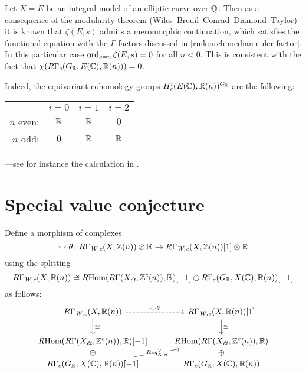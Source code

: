 \documentclass{article}
\numberwithin{equation}{section}
\begin{document}
\begin{example}
  Let $X = E$ be an integral model of an elliptic curve over $\QQ$. Then as a
  consequence of the modularity theorem (Wiles--Breuil--Conrad--Diamond--Taylor)
  it is known that $\zeta (E,s)$ admits a meromorphic continuation, which
  satisfies the functional equation with the $\Gamma$-factors discussed in
  \ref{rmk:archimedian-euler-factor}. In this particular case
  $\ord_{s=n} \zeta (E,s) = 0$ for all $n < 0$. This is consistent with the fact
  that $\chi (R\Gamma_c (G_\RR, E (\CC), \RR (n))) = 0$.

  Indeed, the equivariant cohomology groups $H^i_c (E (\CC), \RR (n))^{G_\RR}$
  are the following:
  \begin{center}
    \renewcommand{\arraystretch}{1.5}
    \begin{tabular}{rccc}
      \hline
      & $i = 0$ & $i = 1$ & $i = 2$ \\
      \hline
      $n$ even: & $\RR$ & $\RR$ & $0$ \\
      $n$ odd: & $0$ & $\RR$ & $\RR$ \\
      \hline
    \end{tabular}
  \end{center}
  ---see for instance the calculation in \cite[Lemma~A.6]{Siebel-2019}.
\end{example}


\section{Special value conjecture}
\label{sec:special-value-conjecture}

\begin{definition}
  Define a morphism of complexes
  \[ \smile\theta\colon R\Gamma_\Wc (X,\ZZ(n)) \otimes \RR \to
    R\Gamma_\Wc (X,\ZZ(n)) [1] \otimes \RR \]
  using the splitting
  \[ R\Gamma_\Wc (X, \RR (n)) \cong
    \RHom (R\Gamma (X_\et, \ZZ^c (n)), \RR) [-1] \oplus
    R\Gamma_c (G_\RR, X (\CC), \RR (n)) [-1] \]
  as follows:
  \[ \begin{tikzcd}
      R\Gamma_\Wc (X, \RR(n)) \ar{d}{\cong}\ar[dashed]{r}{\smile\theta} & R\Gamma_\Wc (X, \RR(n)) [1]\ar{d}{\cong} \\
      \RHom (R\Gamma (X_\et, \ZZ^c (n)), \RR) [-1] & \RHom (R\Gamma (X_\et, \ZZ^c (n)), \RR) \\[-2em]
      \oplus & \oplus \\[-2em]
      R\Gamma_c (G_\RR, X (\CC), \RR (n)) [-1]\ar{uur}[description]{Reg_{X,n}^\vee} & R\Gamma_c (G_\RR, X (\CC), \RR (n))
    \end{tikzcd} \]
\end{definition}
\end{document}
